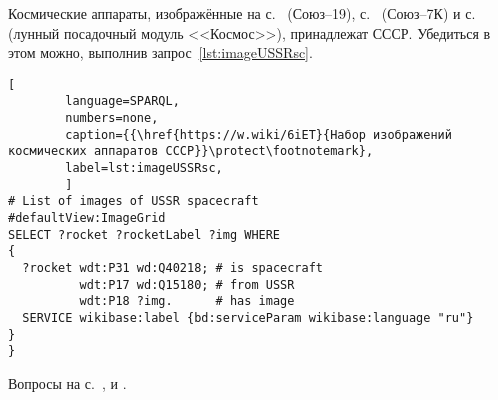 \hfil{}\hfil%
\newpage

\begin{task}
    \label{answer:spacecraft_USSR}
    Космические аппараты, 
    изображённые на с.~\pageref{question:spacecraft_soyuz19} (Союз--19), 
    с.~\pageref{question:spacecraft_soyuzT} (Союз--7К) и с.~\pageref{question:spacecraft_lunar} 
    (лунный посадочный модуль <<Космос>>), принадлежат СССР. 
    Убедиться в этом можно, выполнив запрос~\ref{lst:imageUSSRsc}.

    \begin{lstlisting}[ 
        language=SPARQL, 
        numbers=none, 
        caption={{\href{https://w.wiki/6iET}{Набор изображений космических аппаратов СССР}}\protect\footnotemark}, 
        label=lst:imageUSSRsc, 
        ]
# List of images of USSR spacecraft
#defaultView:ImageGrid
SELECT ?rocket ?rocketLabel ?img WHERE
{
  ?rocket wdt:P31 wd:Q40218; # is spacecraft
          wdt:P17 wd:Q15180; # from USSR
          wdt:P18 ?img.      # has image
  SERVICE wikibase:label {bd:serviceParam wikibase:language "ru"}
}
}\end{lstlisting}

\small{Вопросы на с.~\pageref{question:spacecraft_soyuz19}, 
    \pageref{question:spacecraft_soyuzT} и \pageref{question:spacecraft_lunar}.}
\end{task}



